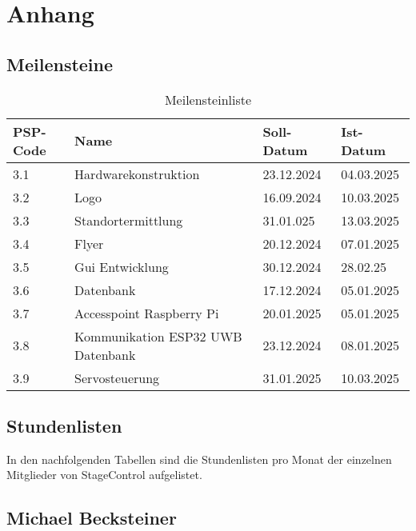 \chapter*{Anhang}

\section*{Meilensteine}
\begin{table}[h]
	\centering
	\begin{tabular}{p{3cm} p{7cm} p{2cm} p{2cm}}
		\hline
		\textbf{PSP-Code} & \textbf{Name} & \textbf{Soll-Datum} & \textbf{Ist-Datum} \\
		\hline
		3.1 & Hardwarekonstruktion & 23.12.2024 & 04.03.2025 \\
		3.2 & Logo & 16.09.2024  & 10.03.2025 \\
		3.3 & Standortermittlung & 31.01.025 & 13.03.2025 \\
		3.4 & Flyer & 20.12.2024 & 07.01.2025 \\
		3.5 & Gui Entwicklung & 30.12.2024 & 28.02.25 \\
		3.6 & Datenbank & 17.12.2024 & 05.01.2025 \\
		3.7 & Accesspoint Raspberry Pi & 20.01.2025 & 05.01.2025 \\
		3.8 & Kommunikation ESP32 UWB Datenbank & 23.12.2024  & 08.01.2025 \\
		3.9 & Servosteuerung & 31.01.2025 & 10.03.2025 \\
		\hline
	\end{tabular}
	\caption{Meilensteinliste}
	\label{tab:Meilensteinliste}
\end{table}

\section*{Stundenlisten}
In den nachfolgenden Tabellen sind die Stundenlisten pro Monat der einzelnen Mitglieder von StageControl aufgelistet.

\section*{Michael Becksteiner}

